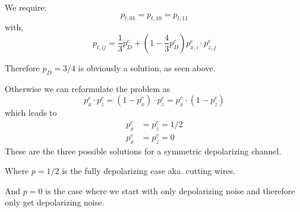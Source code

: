 We require:
\begin{equation}
    p_{t,01}=p_{t,10}=p_{t,11}
\end{equation}
with,
\begin{equation}
    p_{t,ij} = \frac{1}{3} p_D^c + \left( 1- \frac{4}{3} p_D^c \right) p_{x,i}^c \cdot p_{z,j}^c 
\end{equation}

Therefore $p_D=3/4$ is obviously a solution, as seen above.

Otherwise we can reformulate the problem as 
\begin{equation}
    p_{x}^c\cdot p_{z}^c = 
    (1-p_{x}^c)\cdot p_{z}^c = 
    p_{x}^c\cdot (1-p_{z}^c)  
\end{equation}
which leads to 
\begin{align*}
    p_x^c &= p_z^c = 1/2\\
    p_x^c &= p_z^c = 0 
\end{align*}
These are the three possible solutions for a symmetric depolarizing channel.

Where $p=1/2$ is the fully depolarizing case aka. cutting wires.

And $p=0$ is the case where we start with only depolarizing noise and therefore only get depolarizing noise.
